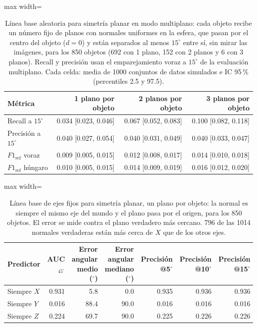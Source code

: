 \begin{table}[htbp]
\centering
\caption{Línea base aleatoria para simetría planar en modo multiplano: cada objeto recibe un número fijo de planos con normales uniformes en la esfera, que pasan por el centro del objeto ($d=0$) y están separados al menos $15^\circ$ entre sí, sin mirar las imágenes, para los 850 objetos (692 con 1 plano, 152 con 2 planos y 6 con 3 planos). Recall y precisión usan el emparejamiento voraz a $15^\circ$ de la evaluación multiplano. Cada celda: media de 1000 conjuntos de datos simulados e IC 95\,\% (percentiles 2.5 y 97.5).}
\label{tab:base_plane_azar_multi}
\begin{adjustbox}{max width=\textwidth}
\begin{tabular}{lrrr}
\toprule
Métrica & 1 plano por objeto & 2 planos por objeto & 3 planos por objeto \\
\midrule
Recall a $15^\circ$ & 0.034 [0.023, 0.046] & 0.067 [0.052, 0.083] & 0.100 [0.082, 0.118] \\
Precisión a $15^\circ$ & 0.040 [0.027, 0.054] & 0.040 [0.031, 0.049] & 0.040 [0.033, 0.047] \\
$F1_{\mathrm{ref}}$ voraz & 0.009 [0.005, 0.015] & 0.012 [0.008, 0.017] & 0.014 [0.010, 0.018] \\
$F1_{\mathrm{ref}}$ húngaro & 0.010 [0.005, 0.015] & 0.014 [0.009, 0.019] & 0.016 [0.012, 0.020] \\
\bottomrule
\end{tabular}
\end{adjustbox}
\end{table}

\begin{table}[htbp]
\centering
\caption{Línea base de ejes fijos para simetría planar, un plano por objeto: la normal es siempre el mismo eje del mundo y el plano pasa por el origen, para los 850 objetos. El error se mide contra el plano verdadero más cercano. 796 de las 1014 normales verdaderas están más cerca de $X$ que de los otros ejes.}
\label{tab:base_plane_fijos}
\begin{adjustbox}{max width=\textwidth}
\begin{tabular}{lrrrrrr}
\toprule
Predictor & AUC$_{45^\circ}$ & Error angular medio ($^\circ$) & Error angular mediano ($^\circ$) & Precisión @5$^\circ$ & Precisión @10$^\circ$ & Precisión @15$^\circ$ \\
\midrule
Siempre $X$ & 0.931 & 5.8 & 0.0 & 0.935 & 0.936 & 0.936 \\
Siempre $Y$ & 0.016 & 88.4 & 90.0 & 0.016 & 0.016 & 0.016 \\
Siempre $Z$ & 0.224 & 69.7 & 90.0 & 0.225 & 0.226 & 0.226 \\
\bottomrule
\end{tabular}
\end{adjustbox}
\end{table}

